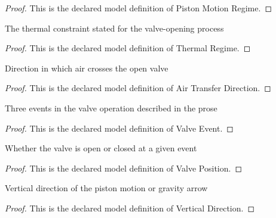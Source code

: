 \begin{proof}
  This is the declared model definition of Piston Motion Regime.
\end{proof}
\begin{definition}
  \label{def:physics:phyx-mini-0448:phyxminiproblems-problemphyxmini0448-thermalregime}
  The thermal constraint stated for the valve-opening process
\end{definition}
\begin{proof}
  This is the declared model definition of Thermal Regime.
\end{proof}
\begin{definition}
  \label{def:physics:phyx-mini-0448:phyxminiproblems-problemphyxmini0448-airtransferdirection}
  Direction in which air crosses the open valve
\end{definition}
\begin{proof}
  This is the declared model definition of Air Transfer Direction.
\end{proof}
\begin{definition}
  \label{def:physics:phyx-mini-0448:phyxminiproblems-problemphyxmini0448-valveevent}
  Three events in the valve operation described in the prose
\end{definition}
\begin{proof}
  This is the declared model definition of Valve Event.
\end{proof}
\begin{definition}
  \label{def:physics:phyx-mini-0448:phyxminiproblems-problemphyxmini0448-valveposition}
  Whether the valve is open or closed at a given event
\end{definition}
\begin{proof}
  This is the declared model definition of Valve Position.
\end{proof}
\begin{definition}
  \label{def:physics:phyx-mini-0448:phyxminiproblems-problemphyxmini0448-verticaldirection}
  Vertical direction of the piston motion or gravity arrow
\end{definition}
\begin{proof}
  This is the declared model definition of Vertical Direction.
\end{proof}
